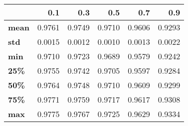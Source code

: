 \begin{tabular}{lrrrrr}
\toprule
{} &     0.1 &     0.3 &     0.5 &     0.7 &     0.9 \\
\midrule
\textbf{mean} &  0.9761 &  0.9749 &  0.9710 &  0.9606 &  0.9293 \\
\textbf{std } &  0.0015 &  0.0012 &  0.0010 &  0.0013 &  0.0022 \\
\textbf{min } &  0.9710 &  0.9723 &  0.9689 &  0.9579 &  0.9242 \\
\textbf{25\% } &  0.9755 &  0.9742 &  0.9705 &  0.9597 &  0.9284 \\
\textbf{50\% } &  0.9764 &  0.9748 &  0.9710 &  0.9609 &  0.9299 \\
\textbf{75\% } &  0.9771 &  0.9759 &  0.9717 &  0.9617 &  0.9308 \\
\textbf{max } &  0.9775 &  0.9767 &  0.9725 &  0.9629 &  0.9334 \\
\bottomrule
\end{tabular}
